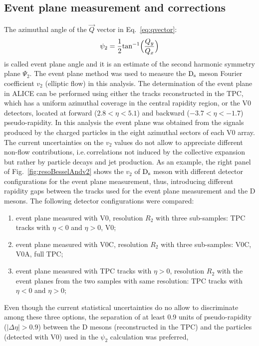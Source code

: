 \subsection{Event plane measurement and corrections}
\label{sec:EPmeasurement}
The azimuthal angle of the $\vec{Q}$ vector in Eq.~\ref{eq:qvector}:
\begin{equation}
\label{eq:psi2}
\psi_2= \frac{1}{2} {\rm tan}^{-1} \Big (\frac{Q_y}{Q_x} \Big )
\end{equation}
is called event plane angle and it is an estimate of the second harmonic symmetry plane $\Psi_2$.
The event plane method was used to measure the ${\rm D_s}$ meson 
Fourier coefficient $v_2$ (elliptic flow) in this analysis.
The determination of the event plane in ALICE can be performed using
either the tracks reconstructed in the TPC, which has a uniform
azimuthal coverage in the central rapidity region, or the V0
detectors, located at forward ($2.8<\eta<5.1$) and backward
($-3.7<\eta<-1.7$) pseudo-rapidity.
In this analysis the event plane was obtained from the 
signals produced by the charged particles in the eight 
azimuthal sectors of each V0 array. 
The current uncertainties on the $v_2$ values do not allow to
appreciate different non-flow contributions, i.e.\,correlations not 
induced by the collective expansion but rather by particle decays and 
jet production. As an example, the right panel of Fig.~\ref{fig:resoBesselAndv2}
shows the $v_2$ of ${\rm D_s}$ meson with different detector configurations
for the event plane measurement, thus, introducing different
rapidity gaps between the tracks used for the event plane measurement
and the D mesons. 
The following detector configurations were compared:
\begin{enumerate}
\item event plane measured with V0,  
resolution $R_2$ with three sub-samples: TPC tracks with $\eta < 0$ and $\eta > 0$, V0; 
\item event plane measured with V0C,  
resolution $R_2$ with three sub-samples: V0C, V0A, full TPC; 
\item event plane measured with TPC tracks with $\eta > 0$,  
resolution $R_2$ with the event planes from the two samples with same resolution: 
TPC tracks with $\eta < 0$ and $\eta > 0$;
\end{enumerate}
Even though the current statistical uncertainties do no allow to discriminate among these three options,
the separation of at least 0.9 units of pseudo-rapidity 
($|\Delta\eta|>0.9$) between the D mesons (reconstructed in the TPC)
and the particles (detected with V0) used in the $\psi_2$ calculation was preferred,
